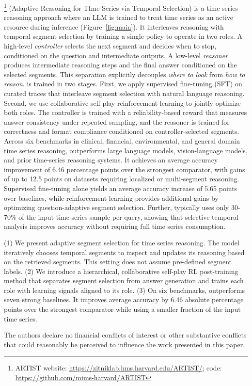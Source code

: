 %
\algoname\footnote{ARTIST website: \url{https://zitniklab.hms.harvard.edu/ARTIST/}; code: \url{https://github.com/mims-harvard/ARTIST}} (Adaptive Reasoning for TIme-Series via Temporal Selection) is a time-series reasoning approach where an LLM is trained to treat time series as an active resource during inference (Figure~\ref{fig:main}). It interleaves reasoning with temporal segment selection by training a single policy to operate in two roles. A high-level \emph{controller} selects the next segment and decides when to stop, conditioned on the question and intermediate outputs. A low-level \emph{reasoner} produces intermediate reasoning steps and the final answer conditioned on the selected segments. This separation explicitly decouples \emph{where to look} from \emph{how to reason}.
%
\algoname is trained in two stages. First, we apply supervised fine-tuning (SFT) on curated traces that interleave segment selection with natural language reasoning. Second, we use collaborative self-play reinforcement learning to jointly optimize both roles. The controller is trained with a reliability-based reward that measures answer consistency under repeated sampling, and the reasoner is trained for correctness and format compliance conditioned on controller-selected segments.
Across six benchmarks in clinical, financial, environmental, and general domain time series reasoning, \algoname outperforms large language models, vision-language models, and prior time-series reasoning systems. It achieves an average accuracy improvement of 6.46 percentage points over the strongest comparator, with gains of up to 12.5 points on datasets requiring localized or multi-segment reasoning. Supervised fine-tuning alone yields an average accuracy increase of 5.65 points over  baselines, while reinforcement learning provides additional gains by optimizing question-adaptive segment selection. Further, \algoname typically uses only 30-70\% of the input time series sample per query, showing that selective temporal analysis improves accuracy without requiring full time series consumption.

(1) We present adaptive segment selection for time series reasoning. The model iteratively chooses temporal segments to inspect and updates its reasoning based on the retrieved segments. This setting does not assume pre-defined segment labels.
(2) We introduce a hierarchical, collaborative self-play RL post-training method that separates segment selection from answer generation and trains each role with learning signals aligned to its role.
(3) On six benchmarks, \algoname outperforms seven strong baselines. It improves average accuracy by 6.46 absolute percentage points over the strongest comparator while using a smaller fraction of the input time series.

The authors declare no financial conflicts of interest or other substantive conflicts that could reasonably be perceived to influence the work presented in this paper.